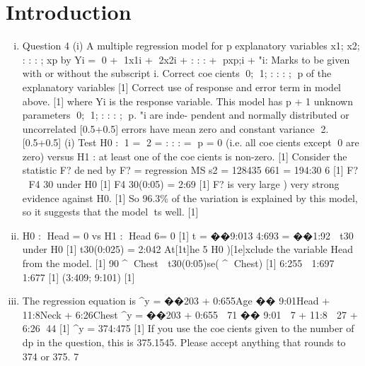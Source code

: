 \documentclass{article}
\author{kobriendublin }
\date{December 2018}
\begin{document}
\section{Introduction}
\begin{enumerate}[(i)]
\item
Question 4 (i) A multiple regression model for p explanatory variables
x1; x2; : : : ; xp by
Yi = 0 + 1x1i + 2x2i + : : : + pxp;i + "i:
Marks to be given with or without the subscript i.
Correct coecients 0; 1; : : : ; p of the explanatory variables [1]
Correct use of response and error term in model above. [1]
where Yi is the response variable.
This model has p + 1 unknown parameters 0; 1; : : : ; p. "i are inde-
pendent and normally distributed or uncorrelated [0.5+0.5]
errors have mean zero and constant variance 2. [0.5+0.5]
(i) Test H0 : 1 = 2 = : : : = p = 0 (i.e. all coecients except 0 are
zero) versus H1 : at least one of the coecients is non-zero. [1]
Consider the statistic F? dened by
F? =
regression MS
s2 =
128435
661
= 194:30
6
[1]
F?  F4
30 under H0
[1]
F4
30(0:05) = 2:69 [1]
F? is very large ) very strong evidence against H0. [1]
So 96.3\% of the variation is explained by this model, so it suggests
that the model ts well. [1]

\item H0 : Head = 0 vs H1 : Head 6= 0 [1]
t =
��9:013
4:693
= ��1:92  t30 under H0 [1]
t30(0:025) = 2:042 At[1t]he 5%
H0 )[1e]xclude the variable Head from the model. [1]
90%
^ Chest  t30(0:05)se( ^ Chest) [1]
6:255  1:697  1:677
[1]
(3:409; 9:101)
[1]
\item The regression equation is
^y = ��203 + 0:655Age �� 9:01Head + 11:8Neck + 6:26Chest
^y = ��203 + 0:655  71 �� 9:01  7 + 11:8  27 + 6:26  44 [1]
^y = 374:475 [1]
If you use the coecients given to the number of dp in the question,
this is 375.1545. Please accept anything that rounds to 374 or 375.
7
\end{enumerate}
\end{document}
